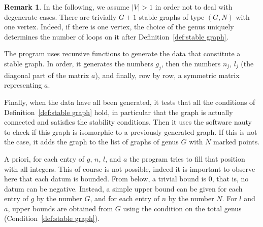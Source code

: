 \documentclass{amsart}
\theoremstyle{plain}
\theoremstyle{definition}
\newtheorem{remark}[theorem]{Remark}
\newcommand{\abs}[1]{\left|#1\right|}
\begin{document}
\begin{remark}
  In the following, we assume $\abs{V} > 1$ in order not to deal with
  degenerate cases. There are trivially $G+1$ stable graphs of type
  $(G, N)$ with one vertex. Indeed, if there is one vertex, the choice
  of the genus uniquely determines the number of loops on it after
  Definition~\ref{def:stable graph}.
\end{remark}

The program uses recursive functions to generate the data that
constitute a stable graph. In order, it generates the numbers $g_j$,
then the numbers $n_j$, $l_j$ (the diagonal part of the matrix $a$),
and finally, row by row, a symmetric matrix representing $a$.

Finally, when the data have all been generated, it tests that all the
conditions of Definition~\ref{def:stable graph} hold, in particular
that the graph is actually connected and satisfies the stability
conditions. Then it uses the software nauty \cite{nauty} to check if
this graph is isomorphic to a previously generated graph. If this is
not the case, it adds the graph to the list of graphs of genus $G$
with $N$ marked points.




A priori, for each entry of $g$, $n$, $l$, and $a$ the program tries
to fill that position with all integers. This of course is not
possible, indeed it is important to observe here that each datum is
bounded. From below, a trivial bound is $0$, that is, no datum can be
negative. Instead, a simple upper bound can be given for each entry of
$g$ by the number $G$, and for each entry of $n$ by the number
$N$. For $l$ and $a$, upper bounds are obtained from $G$ using the
condition on the total genus (Condition~\ref{def:stable graph}).
\end{document}
